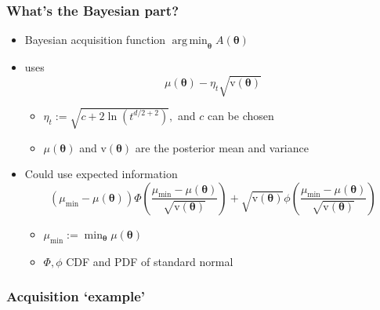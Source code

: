 \documentclass{beamer}
\DeclareMathOperator*{\argmin}{arg\,min}
\begin{document}
\begin{frame}
    \frametitle{What's the Bayesian part?}
    \begin{itemize}
        \item Bayesian acquisition function $\argmin_{\bm{\theta}}A(\bm\theta)$
        \item <2-> \cite{gutmann_bayesian_2016} uses $$\mu(\bm\theta) - \eta_t\sqrt{\mathrm{v}(\bm\theta)}$$ \begin{itemize}
                  \item $\eta_t:= \sqrt{c + 2\ln(t^{d/2 + 2})},$ and $c$ can be chosen
                  \item $\mu(\bm\theta)$ and $\mathrm{v}(\bm\theta)$ are the posterior mean and variance
              \end{itemize}
        \item <3-> Could use expected information $$(\mu_\text{min} - \mu(\bm\theta))
                  \varPhi\left(\frac{\mu_\text{min} - \mu(\bm\theta)}{\sqrt{\mathrm{v}(\bm\theta)}}\right) + \sqrt{\mathrm{v}(\bm\theta)}
                  \phi\left(\frac{\mu_\text{min} - \mu(\bm\theta)}{\sqrt{\mathrm{v}(\bm\theta)}}\right)$$\begin{itemize}
                  \item $\mu_\text{min} := \min_{\bm{\theta}} \mu(\bm\theta)$
                  \item $\varPhi, \phi$ CDF and PDF of standard normal
              \end{itemize}
    \end{itemize}
\end{frame}


\begin{frame}
    \frametitle{Acquisition `example'}
\end{frame}
\end{document}
